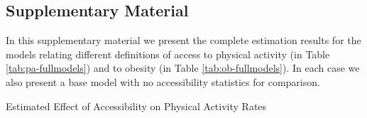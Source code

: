 \documentclass[shortAfour,sageh.bst]{sagej}
\begin{document}




\hypertarget{appendix}{%
\subsection{Supplementary Material}\label{appendix}}
\setcounter{table}{0}
\renewcommand{\thetable}{S\arabic{table}}


In this supplementary material we present the complete estimation results for the
models relating different definitions of access to physical activity (in
Table \ref{tab:pa-fullmodels}) and to obesity (in Table
\ref{tab:ob-fullmodels}). In each case we also present a base model with
no accessibility statistics for comparison.

\begin{table}
  \caption{\label{tab:pa-fullmodels} Estimated Effect of Accessibility on Physical Activity Rates}
  \begin{center}
  \scalebox{0.8}{

}
\end{center}
\end{table}
\end{document}
